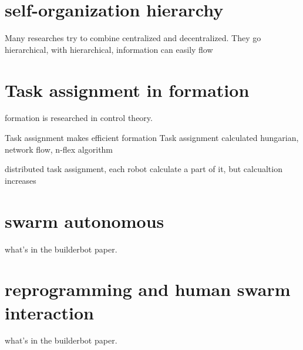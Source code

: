 \section{self-organization hierarchy}

Many researches try to combine centralized and decentralized.
They go hierarchical, with hierarchical, information can easily flow

\section{Task assignment in formation}

formation is researched in control theory.

Task assignment makes efficient formation
Task assignment calculated hungarian, network flow, n-flex algorithm

distributed task assignment, each robot calculate a part of it, but calcualtion increases

\section{swarm autonomous}

what's in the builderbot paper.

\section{reprogramming and human swarm interaction}

what's in the builderbot paper.






